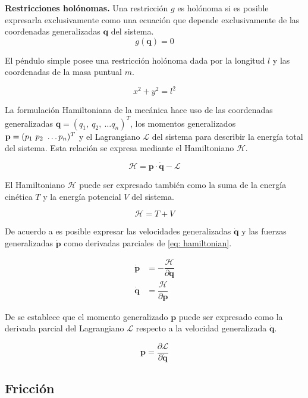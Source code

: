 \textbf{Restricciones holónomas.} Una restricción $g$ es holónoma si es posible 
expresarla exclusivamente como una ecuación que depende exclusivamente de 
las coordenadas generalizadas $\mathbf q$ del sistema.
\begin{equation}
 g(\mathbf q) = 0
\end{equation}

El péndulo simple posee una restricción holónoma dada por la longitud $l$
y las coordenadas de la masa puntual $m$.

\begin{equation}
 x^2 + y^2 = l^2
 \label{eq: holonomic constraint}
\end{equation}


La formulación Hamiltoniana de la mecánica hace uso de las coordenadas 
generalizadas $\mathbf q = (q_1, \ q_2, \ \dots q_n)^T$, 
los momentos generalizados $\bold p = (p_1 \ p_2 \ \dots p_n)^T$ 
y el Lagrangiano $\mathcal L$ del sistema para describir la energía total del sistema. 
Esta relación se expresa mediante el Hamiltoniano $\mathcal H$. 

\begin{equation}
 \mathcal H = \mathbf p \cdot \mathbf {\dot q} - \mathcal L
 \label{eq: hamiltonian}
\end{equation}

El Hamiltoniano $\mathcal H$ puede ser expresado también como la 
suma de la energía cinética $T$ y la energía  potencial $V$
del sistema.

\begin{equation}
 \mathcal H = T + V
\end{equation}

De acuerdo a \cite{susskind2014theoretical} es posible expresar las velocidades
generalizadas $\mathbf{\dot q}$ y las fuerzas generalizadas $\mathbf{\dot p}$ como 
derivadas parciales de \eqref{eq: hamiltonian}.

\begin{subequations}
 \begin{align}
  \mathbf{\dot p} & = - \dfrac{\mathcal H}{\partial \mathbf q}\\
  \mathbf{\dot q} & = \dfrac{\mathcal H}{\partial \mathbf p}
 \end{align}
\end{subequations}

De \cite{Montague:399399} se establece que el momento generalizado $\mathbf p$
puede ser expresado como la derivada parcial del Lagrangiano $\mathcal L$ respecto a
la velocidad generalizada $\mathbf {\dot q}$.

\begin{equation}
 \mathbf p = \dfrac{\partial \mathcal L}{\partial \mathbf{\dot q}}
 \label{eq: generalized momentum}
\end{equation}








\subsection{Fricción}



